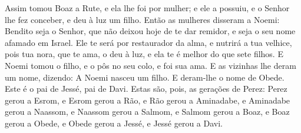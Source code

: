 Assim tomou Boaz a Rute, e ela lhe foi por mulher; e ele a
possuiu, e o Senhor lhe fez conceber, e deu à luz um filho.
Então as mulheres disseram a Noemi: Bendito seja o Senhor,
que não deixou hoje de te dar remidor, e seja o seu nome afamado em
Israel. Ele te será por restaurador da alma, e nutrirá a tua
velhice, pois tua nora, que te ama, o deu à luz, e ela te é melhor
do que sete filhos. E Noemi tomou o filho, e o pôs no seu
colo, e foi sua ama. E as vizinhas lhe deram um nome,
dizendo: A Noemi nasceu um filho. E deram-lhe o nome de Obede. Este
é o pai de Jessé, pai de Davi. Estas são, pois, as gerações
de Perez: Perez gerou a Esrom, e Esrom gerou a Rão, e Rão
gerou a Aminadabe, e Aminadabe gerou a Naassom, e Naassom
gerou a Salmom, e Salmom gerou a Boaz, e Boaz gerou a Obede,
e Obede gerou a Jessé, e Jessé gerou a Davi.

